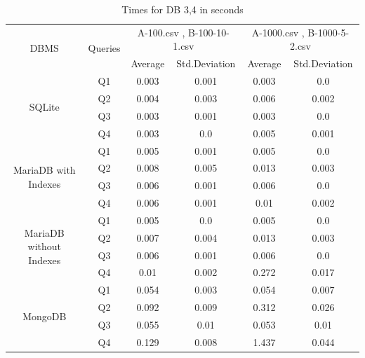 \documentclass[12pt]{article}
\begin{document}
\begin{table}[H]
    \centering
\begin{tabular}{|c|c|c|c|c|c|}
    \hline
    \multirow{2}{*}{DBMS} & \multirow{2}{*}{Queries} & \multicolumn{2}{c|}{A-100.csv , B-100-10-1.csv} & \multicolumn{2}{c|}{A-1000.csv , B-1000-5-2.csv}\\
    \cline{3-6}
     & & Average & Std.Deviation & Average & Std.Deviation\\
    \hline
     \multirow{4}{*}{SQLite} & Q1 & 0.003 & 0.001 & 0.003 & 0.0 \\
\cline{2-6}
& Q2 & 0.004 & 0.003 & 0.006 & 0.002 \\
\cline{2-6}
& Q3 & 0.003 & 0.001 & 0.003 & 0.0 \\
\cline{2-6}
& Q4 & 0.003 & 0.0 & 0.005 & 0.001 \\
     \cline{2-6}
     \hline
     \multirow{4}{*}{MariaDB with Indexes} 
& Q1 & 0.005 & 0.001 & 0.005 & 0.0 \\
\cline{2-6}
& Q2 & 0.008 & 0.005 & 0.013 & 0.003 \\
\cline{2-6}
& Q3 & 0.006 & 0.001 & 0.006 & 0.0 \\
\cline{2-6}
& Q4 & 0.006 & 0.001 & 0.01 & 0.002 \\
     \cline{2-6}
    \hline
    \multirow{4}{*}{MariaDB without Indexes} 
& Q1 & 0.005 & 0.0 & 0.005 & 0.0 \\
\cline{2-6}
& Q2 & 0.007 & 0.004 & 0.013 & 0.003 \\
\cline{2-6}
& Q3 & 0.006 & 0.001 & 0.006 & 0.0 \\
\cline{2-6}
& Q4 & 0.01 & 0.002 & 0.272 & 0.017 \\
     \cline{2-6}
    \hline
    \multirow{4}{*}{MongoDB}
& Q1 & 0.054 & 0.003 & 0.054 & 0.007 \\
\cline{2-6}
& Q2 & 0.092 & 0.009 & 0.312 & 0.026 \\
\cline{2-6}
& Q3 & 0.055 & 0.01 & 0.053 & 0.01 \\
\cline{2-6}
& Q4 & 0.129 & 0.008 & 1.437 & 0.044 \\
     \cline{2-6}
    \hline
\end{tabular}

    \caption{Times for DB 3,4 in seconds}
    \label{tab:my_label}
\end{table}

\newpage
\end{document}

